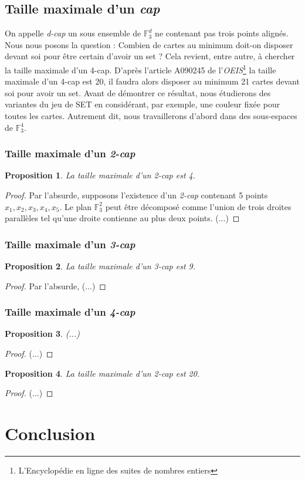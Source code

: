 \documentclass[a4paper,12pt,titlepage]{article}
\theoremstyle{plain}
\newtheorem{prop}{Proposition}
\newcommand{\Ftrois}[1]{\mathbb{F}^#1_3}
\theoremstyle{definition}
\begin{document}
\subsection{Taille maximale d'un \emph{cap}}
On appelle \emph{d-cap} un sous ensemble de  $\Ftrois{d}$ ne contenant pas trois points alignés. \\

Nous nous posons la question : Combien de cartes au minimum doit-on disposer devant soi pour être certain d'avoir un set ? Cela revient, entre autre, à chercher la taille maximale d'un 4-cap. D'après l'article A090245 de l'\emph{OEIS}\footnote{L'Encyclopédie en ligne des suites de nombres entiers} la taille maximale d'un 4-cap est 20, il faudra alors disposer au minimum 21 cartes devant soi pour avoir un set. Avant de démontrer ce résultat, nous étudierons des variantes du jeu de SET en considérant, par exemple, une couleur fixée pour toutes les cartes. Autrement dit, nous travaillerons d'abord dans des sous-espaces de  $\Ftrois{4}$.

\subsubsection{Taille maximale d'un \emph{2-cap}}
\begin{prop}
La taille maximale d'un \emph{2-cap} est 4.
\end{prop}
\begin{proof}
Par l'absurde, supposons l'existence d'un \emph{2-cap} contenant 5 points $x_1,x_2,x_3,x_4,x_5$.
Le plan  $\Ftrois{2}$ peut être décomposé comme l'union de trois droites parallèles tel qu'une droite contienne au plus deux points.  (...)
\end{proof}

\subsubsection{Taille maximale d'un \emph{3-cap}}
\begin{prop}
La taille maximale d'un \emph{3-cap} est 9.
\end{prop}
\begin{proof}
Par l'absurde, (...)
\end{proof}

\subsubsection{Taille maximale d'un \emph{4-cap}}
\begin{prop}
(...)
\end{prop}
\begin{proof}
(...)
\end{proof}

\begin{prop}
La taille maximale d'un \emph{2-cap} est 20.
\end{prop}
\begin{proof}
(...)
\end{proof}

\section{Conclusion}



\end{document}
